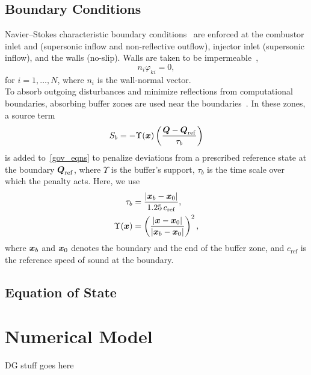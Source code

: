 \documentclass{article}
\begin{document}
\subsection{Boundary Conditions}\label{subsec:boundary_conditions}

Navier--Stokes characteristic boundary conditions~\cite{ref:PoinsotLele1992} are enforced at the combustor inlet and (supersonic inflow and non-reflective outflow), injector inlet (supersonic inflow), and the walls (no-slip). Walls are taken to be impermeable~\cite{ref:YooIm2007,ref:Kolla2012},
\begin{equation}
  n_{i}\varphi_{ki} = 0,
\end{equation}
for $i = 1,\dots,N$, where $n_{i}$ is the wall-normal vector. \\
  
To absorb outgoing disturbances and minimize reflections from computational boundaries, absorbing buffer zones are used near the boundaries~\cite{ref:Freund1997,ref:Colonius2004}. In these zones, a source term
\begin{equation}
  S_{b} = -\Upsilon(\boldsymbol{x})\left( \frac{ \boldsymbol{Q} - \boldsymbol{Q}_{\mathrm{ref}} }{ \tau_{b} } \right)
\end{equation}
is added to~\eqref{gov_eqns} to penalize deviations from a prescribed reference state at the boundary $\boldsymbol{Q}_{\mathrm{ref}}$, where $\Upsilon$ is the buffer's support, $\tau_{b}$ is the time scale over which the penalty acts. Here, we use
\begin{align}
  \tau_{b} &= \frac{ | \boldsymbol{x}_{b} - \boldsymbol{x}_{0} | }{ 1.25\,c_{\mathrm{ref}} }, \\
  \Upsilon(\boldsymbol{x}) &= \left(  \frac{ | \boldsymbol{x} - \boldsymbol{x}_{0} | }{ | \boldsymbol{x}_{b} - \boldsymbol{x}_{0} | }  \right)^{2},
\end{align}
where $\boldsymbol{x}_{b}$ and $\boldsymbol{x}_{0}$ denotes the boundary and the end of the buffer zone, and $c_{\mathrm{ref}}$ is the reference speed of sound at the boundary.

\subsection{Equation of State}\label{subsec:eos}

\section{Numerical Model}\label{sec:model}

DG stuff goes here
\end{document}
